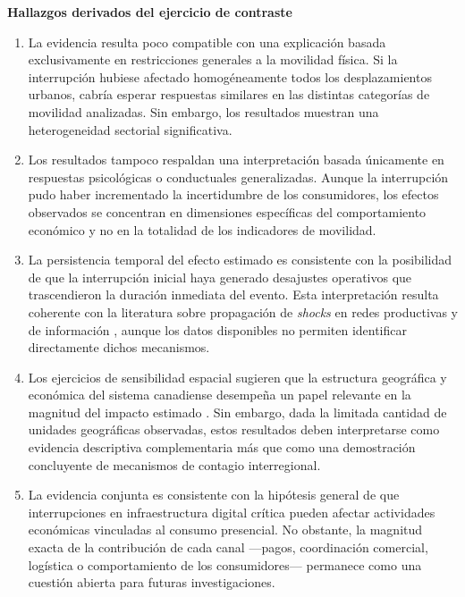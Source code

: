 \textbf{Hallazgos derivados del ejercicio de contraste}

\begin{enumerate}
\item La evidencia resulta poco compatible con una explicaci\'on basada exclusivamente en restricciones generales a la movilidad f\'isica. Si la interrupci\'on hubiese afectado homog\'eneamente todos los desplazamientos urbanos, cabr\'ia esperar respuestas similares en las distintas categor\'ias de movilidad analizadas. Sin embargo, los resultados muestran una heterogeneidad sectorial significativa.
\item Los resultados tampoco respaldan una interpretaci\'on basada \'unicamente en respuestas psicol\'ogicas o conductuales generalizadas. Aunque la interrupci\'on pudo haber incrementado la incertidumbre de los consumidores, los efectos observados se concentran en dimensiones espec\'ificas del comportamiento econ\'omico y no en la totalidad de los indicadores de movilidad.
\item La persistencia temporal del efecto estimado es consistente con la posibilidad de que la interrupci\'on inicial haya generado desajustes operativos que trascendieron la duraci\'on inmediata del evento. Esta interpretaci\'on resulta coherente con la literatura sobre propagaci\'on de \textit{shocks} en redes productivas y de informaci\'on \citep{carvalho2021supply, delrio2020supply}, aunque los datos disponibles no permiten identificar directamente dichos mecanismos.
\item Los ejercicios de sensibilidad espacial sugieren que la estructura geogr\'afica y econ\'omica del sistema canadiense desempe\~na un papel relevante en la magnitud del impacto estimado \citep{newman2010networks, kleinberg-networks-book}. Sin embargo, dada la limitada cantidad de unidades geogr\'aficas observadas, estos resultados deben interpretarse como evidencia descriptiva complementaria m\'as que como una demostraci\'on concluyente de mecanismos de contagio interregional.
\item La evidencia conjunta es consistente con la hip\'otesis general de que interrupciones en infraestructura digital cr\'itica pueden afectar actividades econ\'omicas vinculadas al consumo presencial. No obstante, la magnitud exacta de la contribuci\'on de cada canal ---pagos, coordinaci\'on comercial, log\'istica o comportamiento de los consumidores--- permanece como una cuesti\'on abierta para futuras investigaciones.
\end{enumerate}

